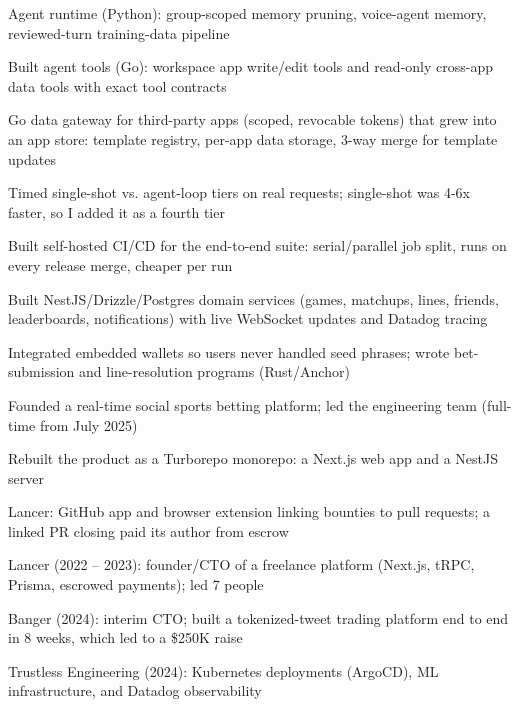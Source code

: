 \documentclass[print]{jack-resume}
\begin{document}
\begin{tightemize}
    \item Agent runtime (Python): group-scoped memory pruning, voice-agent memory, reviewed-turn training-data pipeline
    \item Built agent tools (Go): workspace app write/edit tools and read-only cross-app data tools with exact tool contracts
    \item Go data gateway for third-party apps (scoped, revocable tokens) that grew into an app store: template registry, per-app data storage, 3-way merge for template updates
    \item Timed single-shot vs. agent-loop tiers on real requests; single-shot was 4-6x faster, so I added it as a fourth tier
    \item Built self-hosted CI/CD for the end-to-end suite: serial/parallel job split, runs on every release merge, cheaper per run
\end{tightemize}
\sectionsep

\begin{tightemize}
    \item Built NestJS/Drizzle/Postgres domain services (games, matchups, lines, friends, leaderboards, notifications) with live WebSocket updates and Datadog tracing
    \item Integrated embedded wallets so users never handled seed phrases; wrote bet-submission and line-resolution programs (Rust/Anchor)
    \item Founded a real-time social sports betting platform; led the engineering team (full-time from July 2025)
    \item Rebuilt the product as a Turborepo monorepo: a Next.js web app and a NestJS server
\end{tightemize}
\sectionsep

\begin{tightemize}
    \item Lancer: GitHub app and browser extension linking bounties to pull requests; a linked PR closing paid its author from escrow
    \item Lancer (2022 -- 2023): founder/CTO of a freelance platform (Next.js, tRPC, Prisma, escrowed payments); led 7 people
    \item Banger (2024): interim CTO; built a tokenized-tweet trading platform end to end in 8 weeks, which led to a \$250K raise
    \item Trustless Engineering (2024): Kubernetes deployments (ArgoCD), ML infrastructure, and Datadog observability
\end{tightemize}
\sectionsep
\end{document}
